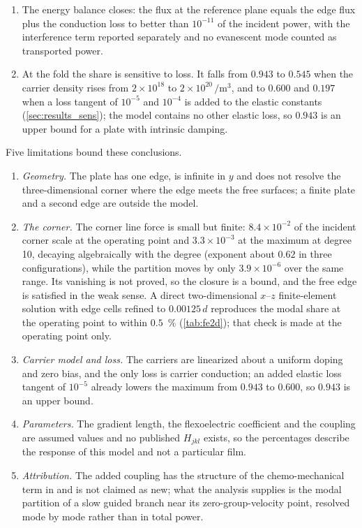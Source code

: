 \begin{enumerate}
$|H|=0.05H^{*}$ it reduces the partition by \SI{1.21}{\percent} at the operating
point and by \SI{36.1}{\percent} at the maximum, of which 22.3 percentage points are
propagation loss between the edge and the reference plane.  When the maximum is
searched again at each coupling level it shifts and its upper bound falls, so the
coupling lowers the achievable conversion as well as displacing it.
\item The energy balance closes: the flux at the reference plane equals the edge
flux plus the conduction loss to better than $10^{-11}$ of the incident power, with
the interference term reported separately and no evanescent mode counted as
transported power.
\item At the fold the share is sensitive to loss.  It falls from $0.943$ to $0.545$ when the carrier density rises from $2\times10^{18}$ to $2\times10^{20}\,\si{\per\cubic\metre}$, and to $0.600$ and $0.197$ when a loss tangent of $10^{-5}$ and $10^{-4}$ is added to the elastic constants (\cref{sec:results_sens}); the model contains no other elastic loss, so $0.943$ is an upper bound for a plate with intrinsic damping.
\end{enumerate}

Five limitations bound these conclusions.

\begin{enumerate}
\item \emph{Geometry.}  The plate has one edge, is infinite in $y$ and does not resolve the three-dimensional corner where the edge meets the free surfaces; a finite plate and a second edge are outside the model.
\item \emph{The corner.}  The corner line force is small but finite: $8.4\times10^{-2}$ of the incident corner scale at the operating point and $3.3\times10^{-3}$ at the maximum at degree 10, decaying algebraically with the degree (exponent about $0.62$ in three configurations), while the partition moves by only $3.9\times10^{-6}$ over the same range.  Its vanishing is not proved, so the closure is a bound, and the free edge is satisfied in the weak sense.  A direct two-dimensional $x$--$z$ finite-element solution with edge cells refined to $0.00125\,d$ reproduces the modal share at the operating point to within $0.5$~\% (\cref{tab:fe2d}); that check is made at the operating point only.
\item \emph{Carrier model and loss.}  The carriers are linearized about a uniform doping and zero bias, and the only loss is carrier conduction; an added elastic loss tangent of $10^{-5}$ already lowers the maximum from $0.943$ to $0.600$, so $0.943$ is an upper bound.
\item \emph{Parameters.}  The gradient length, the flexoelectric coefficient and the coupling are assumed values and no published $H_{jkl}$ exists, so the percentages describe the response of this model and not a particular film.
\item \emph{Attribution.}  The added coupling has the structure of the chemo-mechanical term in \cite{qu2025thermodynamic} and is not claimed as new; what the analysis supplies is the modal partition of a slow guided branch near its zero-group-velocity point, resolved mode by mode rather than in total power.
\end{enumerate}

